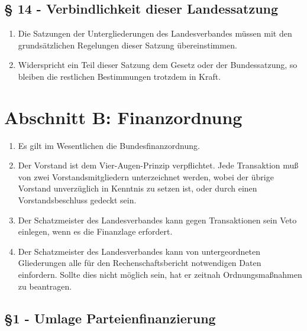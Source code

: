 \documentclass[draft,a4paper,10pt]{article}
\begin{document}
\subsection{§ 14 - Verbindlichkeit dieser Landessatzung}
\begin{enumerate}
\item Die Satzungen der Untergliederungen des Landesverbandes müssen mit den
grundsätzlichen Regelungen dieser Satzung übereinstimmen.

\item Widerspricht ein Teil dieser Satzung dem Gesetz oder der Bundessatzung, so
bleiben die restlichen Bestimmungen trotzdem in Kraft.
\end{enumerate}


\section{Abschnitt B: Finanzordnung}
\begin{enumerate}
\item Es gilt im Wesentlichen die Bundesfinanzordnung.

\item Der Vorstand ist dem Vier-Augen-Prinzip verpflichtet. Jede Transaktion muß
von zwei Vorstandsmitgliedern unterzeichnet werden, wobei der übrige Vorstand
unverzüglich in Kenntnis zu setzen ist, oder durch einen Vorstandsbeschluss
gedeckt sein.

\item Der Schatzmeister des Landesverbandes kann gegen Transaktionen sein Veto
einlegen, wenn es die Finanzlage erfordert.

\item Der Schatzmeister des Landesverbandes kann von untergeordneten
Gliederungen alle für den Rechenschaftsbericht notwendigen Daten einfordern.
Sollte dies nicht möglich sein, hat er zeitnah Ordnungsmaßnahmen zu beantragen.
\end{enumerate}

\subsection{§1 - Umlage Parteienfinanzierung }
\end{document}
